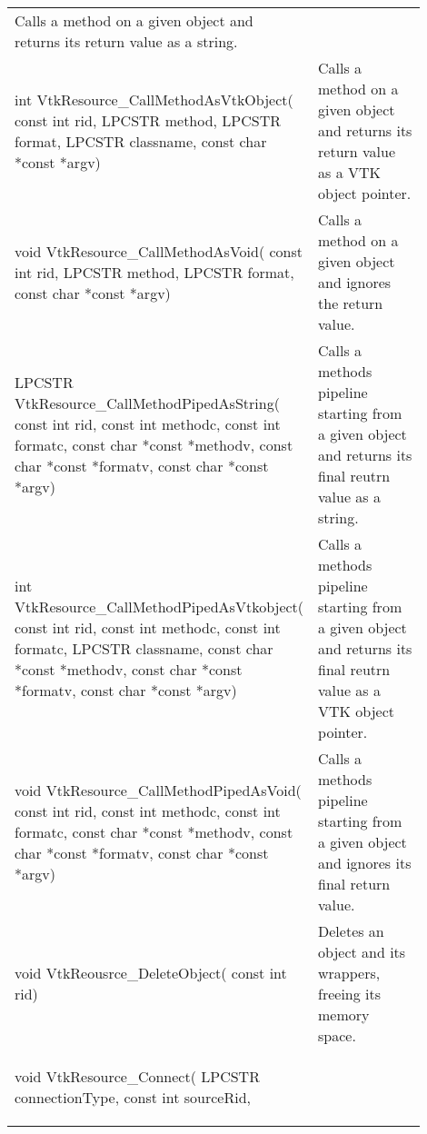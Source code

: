\begin{appendices}
\begin{landscape}
\begin{longtable}[c]{
			>{\raggedright\arraybackslash}p{0.4\linewidth}
			>{\raggedright\arraybackslash}p{0.5\linewidth}
		}
	Calls a method on a given object and returns its return value as a string.
	\\
	\begin{codify}
	int VtkResource_CallMethodAsVtkObject(
		const int rid,
		LPCSTR method,
		LPCSTR format,
		LPCSTR classname,
		const char *const *argv)
	\end{codify} &
	Calls a method on a given object and returns its return value as a VTK object pointer.
	\\
	\begin{codify}
	void VtkResource_CallMethodAsVoid(
		const int rid,
		LPCSTR method,
		LPCSTR format,
		const char *const *argv)
	\end{codify} &
	Calls a method on a given object and ignores the return value.
	\\
	\begin{codify}
	LPCSTR VtkResource_CallMethodPipedAsString(
		const int rid,
		const int methodc,
		const int formatc,
		const char *const *methodv,
		const char *const *formatv,
		const char *const *argv)
	\end{codify} &
	Calls a methods pipeline starting from a given object and returns its final reutrn value as a string.
	\\
	\begin{codify}
	int VtkResource_CallMethodPipedAsVtkobject(
		const int rid,
		const int methodc,
		const int formatc,
		LPCSTR classname,
		const char *const *methodv,
		const char *const *formatv,
		const char *const *argv)
	\end{codify} &
	Calls a methods pipeline starting from a given object and returns its final reutrn value as a VTK object pointer.
	\\
	\begin{codify}
	void VtkResource_CallMethodPipedAsVoid(
		const int rid,
		const int methodc,
		const int formatc,
		const char *const *methodv,
		const char *const *formatv,
		const char *const *argv)
	\end{codify} &
	Calls a methods pipeline starting from a given object and ignores its final return value.
	\\
	\begin{codify}
	void VtkReousrce_DeleteObject(
		const int rid)
	\end{codify} &
	Deletes an object and its wrappers, freeing its memory space.
	\\
	\begin{codify}
	void VtkResource_Connect(
		LPCSTR connectionType,
		const int sourceRid,

\end{codify}
\end{longtable}
\end{landscape}
\end{appendices}
